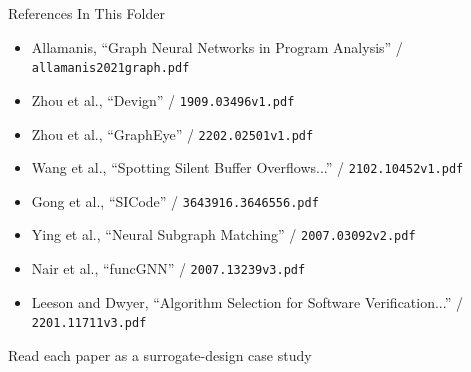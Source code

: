 \documentclass[10pt]{beamer}
\begin{document}
\begin{frame}{References In This Folder}
  \scriptsize
  \begin{itemize}
    \item Allamanis, ``Graph Neural Networks in Program Analysis'' / \texttt{allamanis2021graph.pdf}
    \item Zhou et al., ``Devign'' / \texttt{1909.03496v1.pdf}
    \item Zhou et al., ``GraphEye'' / \texttt{2202.02501v1.pdf}
    \item Wang et al., ``Spotting Silent Buffer Overflows...'' / \texttt{2102.10452v1.pdf}
    \item Gong et al., ``SICode'' / \texttt{3643916.3646556.pdf}
    \item Ying et al., ``Neural Subgraph Matching'' / \texttt{2007.03092v2.pdf}
    \item Nair et al., ``funcGNN'' / \texttt{2007.13239v3.pdf}
    \item Leeson and Dwyer, ``Algorithm Selection for Software Verification...'' / \texttt{2201.11711v3.pdf}
  \end{itemize}
\end{frame}

\begin{frame}[standout]
  Read each paper as a surrogate-design case study
\end{frame}
\end{document}
